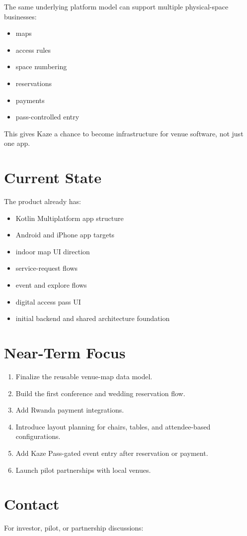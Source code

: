 \documentclass[11pt,a4paper]{article}
\begin{document}
The same underlying platform model can support multiple physical-space businesses:
\begin{itemize}
    \item maps
    \item access rules
    \item space numbering
    \item reservations
    \item payments
    \item pass-controlled entry
\end{itemize}

This gives Kaze a chance to become infrastructure for venue software, not just one app.

\section{Current State}

The product already has:
\begin{itemize}
    \item Kotlin Multiplatform app structure
    \item Android and iPhone app targets
    \item indoor map UI direction
    \item service-request flows
    \item event and explore flows
    \item digital access pass UI
    \item initial backend and shared architecture foundation
\end{itemize}

\section{Near-Term Focus}

\begin{enumerate}
    \item Finalize the reusable venue-map data model.
    \item Build the first conference and wedding reservation flow.
    \item Add Rwanda payment integrations.
    \item Introduce layout planning for chairs, tables, and attendee-based configurations.
    \item Add Kaze Pass-gated event entry after reservation or payment.
    \item Launch pilot partnerships with local venues.
\end{enumerate}

\section{Contact}

For investor, pilot, or partnership discussions:

\KazeContactBlock
\end{document}
